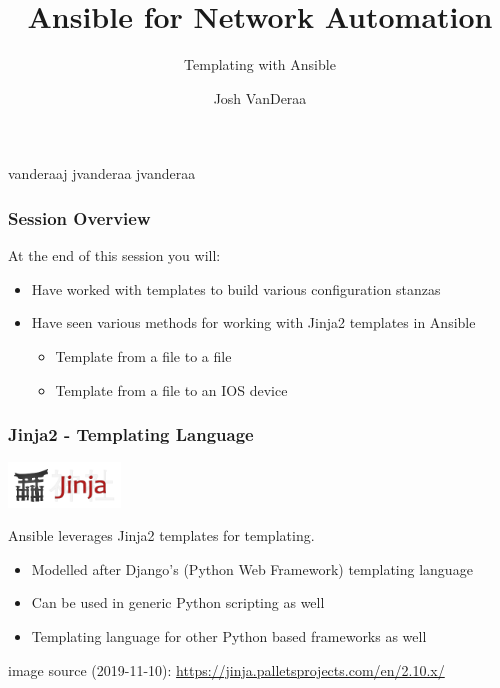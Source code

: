 \documentclass[aspectratio=169]{beamer}
\title{Ansible for Network Automation}
\subtitle{Templating with Ansible}
\date{}
\author{Josh VanDeraa}
\begin{document}
\begin{frame}
  \maketitle
  \footnotesize
  \faTwitter vanderaaj \hfill \faGithub jvanderaa \hfill \faSlack jvanderaa
\end{frame}

\begin{frame}
    \frametitle{Session Overview}
    At the end of this session you will:
    \begin{itemize}
      \item <2-> Have worked with templates to build various configuration stanzas
      \item <3-> Have seen various methods for working with Jinja2 templates in Ansible
      \begin{itemize}
          \item <3-> Template from a file to a file
          \item <4-> Template from a file to an IOS device
      \end{itemize}
    \end{itemize}
  \end{frame}

  \begin{frame}[t]
    \frametitle{Jinja2 - Templating Language}
      \begin{center}
        \includegraphics[width=3cm]{assets/jinja-logo.png}
      \end{center}
      Ansible leverages Jinja2 templates for templating.
      \begin{itemize}
          \item Modelled after Django's (Python Web Framework) templating language
          \item Can be used in generic Python scripting as well
          \item Templating language for other Python based frameworks as well
      \end{itemize}
      \tiny
      \vfill
      image source (2019-11-10): \url{https://jinja.palletsprojects.com/en/2.10.x/}
  \end{frame}
\end{document}
